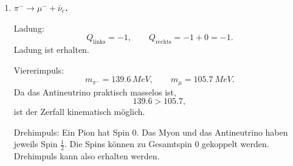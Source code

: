 \documentclass[11pt,a4paper]{scrartcl}
\theoremstyle{definition}
\theoremstyle{plain}
\theoremstyle{remark}
\begin{document}
\begin{enumerate}[label=(\alph*)]
\begin{calculationbox}
        Viererimpuls:
        \[
            m_{\pi^+}=\SI{139.6}{MeV}
        \]
        ist deutlich größer als
        \[
            m_e\approx\SI{0.511}{MeV},
        \]
        und Neutrino sowie Photon sind praktisch masselos. Der Zerfall ist kinematisch möglich.

        Drehimpuls:
        Das Pion hat Spin $0$. Im Endzustand gibt es ein Positron, ein Neutrino und ein Photon. Durch Spin- und Bahndrehimpulskopplung kann Gesamt-$J=0$ erreicht werden. Drehimpuls ist daher nicht offensichtlich verletzt.

        Leptonenzahl:
        \[
            L_{\mathrm{links}}=0.
        \]
        Rechts gilt:
        \[
            L(e^+)=-1,
            \qquad
            L(\nu_e)=+1,
            \qquad
            L(\gamma)=0.
        \]
        Also:
        \[
            L_{\mathrm{rechts}}=-1+1+0=0.
        \]
        Leptonenzahl ist erhalten.

        Baryonenzahl:
        \[
            B_{\mathrm{links}}=0,
            \qquad
            B_{\mathrm{rechts}}=0.
        \]
    \end{calculationbox}

    \begin{answerbox}
        Bei
        \[
            \pi^+\to e^+ + \nu_e+\gamma
        \]
        wird keiner der geforderten Erhaltungssätze verletzt. Es handelt sich um einen radiativen Pionzerfall:
        \[
            \boxed{\text{nach den geforderten Kriterien erlaubt.}}
        \]
    \end{answerbox}

    \item \textbf{$\pi^-\to\mu^-+\overline\nu_e$.}

    \begin{calculationbox}
        Ladung:
        \[
            Q_{\mathrm{links}}=-1,
            \qquad
            Q_{\mathrm{rechts}}=-1+0=-1.
        \]
        Ladung ist erhalten.

        Viererimpuls:
        \[
            m_{\pi^-}=\SI{139.6}{MeV},
            \qquad
            m_\mu=\SI{105.7}{MeV}.
        \]
        Da das Antineutrino praktisch masselos ist,
        \[
            139.6>105.7,
        \]
        ist der Zerfall kinematisch möglich.

        Drehimpuls:
        Ein Pion hat Spin $0$. Das Myon und das Antineutrino haben jeweils Spin $\frac12$. Die Spins können zu Gesamtspin $0$ gekoppelt werden. Drehimpuls kann also erhalten werden.


\end{calculationbox}
\end{enumerate}
\end{document}
